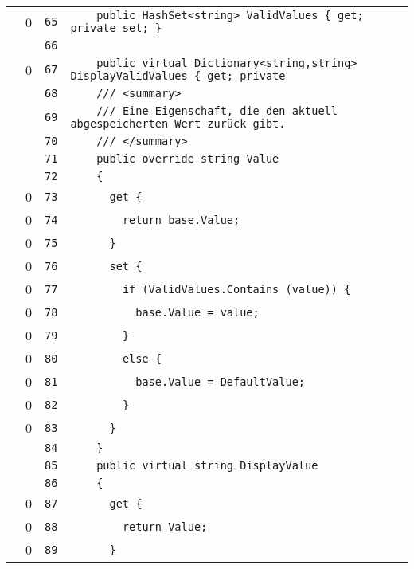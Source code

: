 \documentclass[a4paper,10pt]{article}
\begin{document}
\begin{longtable}[l]{lrrl}
\cellcolor{red} & 0 & \verb~65~ & \verb~    public HashSet<string> ValidValues { get; private set; }~\\
\cellcolor{gray} &  & \verb~66~ & \verb~~\\
\cellcolor{red} & 0 & \verb~67~ & \verb~    public virtual Dictionary<string,string> DisplayValidValues { get; private~\\
\cellcolor{gray} &  & \verb~68~ & \verb~    /// <summary>~\\
\cellcolor{gray} &  & \verb~69~ & \verb~    /// Eine Eigenschaft, die den aktuell abgespeicherten Wert zurück gibt.~\\
\cellcolor{gray} &  & \verb~70~ & \verb~    /// </summary>~\\
\cellcolor{gray} &  & \verb~71~ & \verb~    public override string Value~\\
\cellcolor{gray} &  & \verb~72~ & \verb~    {~\\
\cellcolor{red} & 0 & \verb~73~ & \verb~      get {~\\
\cellcolor{red} & 0 & \verb~74~ & \verb~        return base.Value;~\\
\cellcolor{red} & 0 & \verb~75~ & \verb~      }~\\
\cellcolor{red} & 0 & \verb~76~ & \verb~      set {~\\
\cellcolor{red} & 0 & \verb~77~ & \verb~        if (ValidValues.Contains (value)) {~\\
\cellcolor{red} & 0 & \verb~78~ & \verb~          base.Value = value;~\\
\cellcolor{red} & 0 & \verb~79~ & \verb~        }~\\
\cellcolor{red} & 0 & \verb~80~ & \verb~        else {~\\
\cellcolor{red} & 0 & \verb~81~ & \verb~          base.Value = DefaultValue;~\\
\cellcolor{red} & 0 & \verb~82~ & \verb~        }~\\
\cellcolor{red} & 0 & \verb~83~ & \verb~      }~\\
\cellcolor{gray} &  & \verb~84~ & \verb~    }~\\
\cellcolor{gray} &  & \verb~85~ & \verb~    public virtual string DisplayValue~\\
\cellcolor{gray} &  & \verb~86~ & \verb~    {~\\
\cellcolor{red} & 0 & \verb~87~ & \verb~      get {~\\
\cellcolor{red} & 0 & \verb~88~ & \verb~        return Value;~\\
\cellcolor{red} & 0 & \verb~89~ & \verb~      }~\\

\end{longtable}
\end{document}
